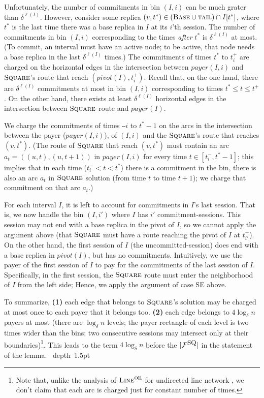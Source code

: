 \documentclass[11pt]{article}
\def\blackslug{\hbox{\hskip 1pt \vrule width 4pt height 8pt
    depth 1.5pt \hskip 1pt}}
\def\QED{\quad\blackslug\lower 8.5pt\null\par}
\newcommand{\lfun}[1]{\ell(#1)}
\newcommand{\calF}{\mathcal{F}}
\newcommand{\lineon}{\mbox{\sc Line}^{\mbox{\upshape on}}}
\newcommand{\DBase}[0]{{\mbox{\sc Base}}}
\newcommand{\Square}[0]{\mbox{\sc Square}}
\newcommand{\nn}{n}
\newcommand{\tminus}[2]{t^{-}_{#1}#2}
\newcommand{\tplus}[1]{t^{+}_{#1}}
\newcommand{\payer}[0]{payer}
\newcommand{\tail}[0]{\mbox{\sc tail}}
\newcommand{\FSQ}[0]{\calF^{\mbox{\small\upshape SQ}}}
\newcommand{\pivot}[0]{pivot}
\begin{document}
Unfortunately, the number of commitments in bin $(I,i)$ can be much grater than $\delta^{\lfun{I}}$.
However, consider some replica $(v,t^*)\in(\DBase\cup\tail)\cap I[t^*]$, where $t^*$ is the last time there was a base replica in $I$ at its $i$'th session.
The number of commitments in bin $(I,i)$ corresponding to the times {\em after} $t^*$ is $\delta^{\lfun{I}}$ at most.
(To commit, an interval must have an active node; to be active, that node needs a base replica in the last $\delta^{\lfun{I}}$ times.)
The commitments of times $t^*$ to $\tplus{i}$ are charged on the horizontal edges in the intersection between
$\payer(I,i)$
and $\Square$'s route that reach $(\pivot(I),\tplus{i})$.
Recall that, on the one hand, there are $\delta^{\lfun{I}}$ commitments at most in bin $(I,i)$ corresponding to times $t^*\leq t\leq \tplus{}$.
On the other hand, there exists at least $\delta^{\lfun{I}}$ horizontal edges in the intersection between $\Square$ route and $\payer(I)$.

We charge the commitments of times $\tminus{i}$ to $t^*-1$ on the arcs
in the intersection between the payer ($\payer(I,i)$), of $(I,i)$  and
the $\Square$'s route that reaches $(v,t^*)$.
(The route of $\Square$ that reach $(v,t^*)$ must contain an arc $a_t=((u,t),(u,t+1))$
in $\payer(I,i)$ for every time $t\in[\tminus{i},t^*-1]$;
this implies that in each time ($t_i^-  < t < t^*$) there is a commitment in the bin,
there is also an arc $a_t$ in $\Square$ solution (from time $t$ to time $t+1$);
we charge that commitment on that arc $a_t$.)



For each interval $I$, it is left to account for commitments in $I$'s last session.
That is, we now handle the bin $(I,i')$ where $I$ has $i'$ commitment-sessions.
This session may not end with a base replica in the pivot of $I$, so we cannot apply the argument above
(that $\Square$ must have a route reaching the pivot of $I$ at $\tplus{i'}$).
On the other hand, the first session of $I$ (the uncommitted-session) does end with a base replica in $\pivot(I)$, but has no commitments.
Intuitively, we use the payer of the first session of $I$ to pay for the commitments of the last session of $I$.
Specifically, in the first session, the $\Square$ route must enter the neighborhood of $I$ from the left side;
Hence, we apply the argument of case SE above.

To summarize,
{\bf (1)} each edge that belongs to $\Square$'s solution may be charged at most once to each payer that it belongs too.
{\bf (2)} each edge belongs to $4\log_\delta n$ payers at most (there are $\log_\delta n$ levels;
the payer rectangle of each level is two times wider than the bins; two consecutive sessions may intersect only at their boundaries)\footnote{
Note that, unlike the analysis of $\lineon$ for undirected line network \cite{KK2014,KK2014TR},
we don't claim that each arc is charged just for constant number of times.
}.
This leads to the term $4\log_\delta \nn$ before the $|\FSQ|$ in the statement of the lemma.
\QED
\end{document}
